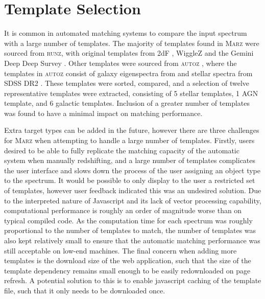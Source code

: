 \documentclass[5p]{elsarticle}
\newcommand{\runz}{\textsc{runz}}
\newcommand{\autoz}{\textsc{autoz}}
\newcommand{\marz}{\textsc{Marz}}
\begin{document}
\section{Template Selection} \label{sec:templates}





It is common in automated matching systems to compare the input spectrum with a large number of templates. The majority of templates found in \marz{} were sourced from \runz{}, with original templates from 2dF \citep{colless2001}, WiggleZ \citep{Drinkwater2010} and the Gemini Deep Deep Survey \citet{abraham2004}. Other templates were sourced from \autoz{} \citep{baldry2014galaxy}, where the templates in \autoz{}  consist of galaxy eigenspectra from \citet{BoltonSchlegel2012} and stellar spectra from SDSS DR2 \citep{SubbaRao2002}. These templates were sorted, compared, and a selection of twelve representative templates were extracted, consisting of 5 stellar templates, 1 AGN template, and 6 galactic templates. Inclusion of a greater number of templates was found to have a minimal impact on matching performance.

Extra target types can be added in the future, however there are three challenges for \marz{} when attempting to handle a large number of templates. Firstly, users desired to be able to fully replicate the matching capacity of the automatic system when manually redshifting, and a large number of templates complicates the user interface and slows down the process of the user assigning an object type to the spectrum. It would be possible to only display to the user a restricted set of templates, however user feedback indicated this was an undesired solution. Due to the interpreted nature of Javascript and its lack of vector processing capability, computational performance is roughly an order of magnitude worse than on typical compiled code. As the computation time for each spectrum was roughly proportional to the number of templates to match, the number of templates was also kept relatively small to ensure that the automatic matching performance was still acceptable on low-end machines. The final concern when adding more templates is the download size of the web application, such that the size of the template dependency remains small enough to be easily redownloaded on page refresh. A potential solution to this is to enable javascript caching of the template file, such that it only needs to be downloaded once.
\end{document}
